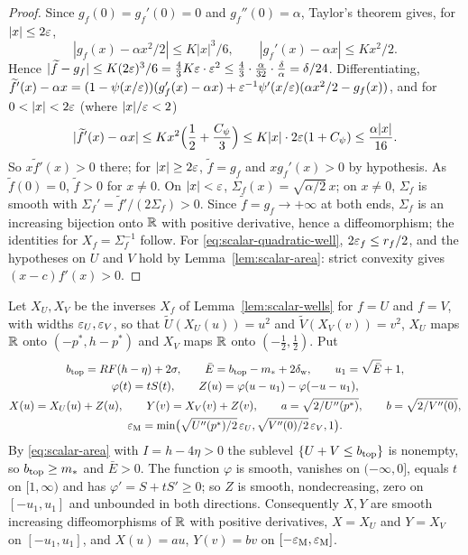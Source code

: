 \begin{proof}
Since $g_f(0)=g_f'(0)=0$ and $g_f''(0)=\alpha$, Taylor's theorem gives, for $|x|\le2\varepsilon$,
\[
 |g_f(x)-\alpha x^2/2|\le K|x|^3/6,\qquad |g_f'(x)-\alpha x|\le Kx^2/2 .
\]
Hence $|\widetilde f-g_f|\le K(2\varepsilon)^3/6=\frac43K\varepsilon\cdot\varepsilon^2\le\frac43\cdot\frac\alpha{32}\cdot\frac\delta\alpha
=\delta/24$. Differentiating,
$\widetilde f'(x)-\alpha x=(1-\psi(x/\varepsilon))(g_f'(x)-\alpha x)+\varepsilon^{-1}\psi'(x/\varepsilon)(\alpha x^2/2-g_f(x))$, and for
$0<|x|<2\eps$ (where $|x|/\varepsilon<2$)
\[
 |\widetilde f'(x)-\alpha x|\le Kx^2\Bigl(\frac12+\frac{C_\psi}3\Bigr)\le K|x|\cdot2\varepsilon(1+C_\psi)\le\frac{\alpha|x|}{16}.
\]
So $x\widetilde f'(x)>0$ there; for $|x|\ge2\varepsilon$, $\widetilde f=g_f$ and $xg_f'(x)>0$ by hypothesis. As
$\widetilde f(0)=0$, $\widetilde f>0$ for $x\ne0$. On $|x|<\varepsilon$, $\Sigma_f(x)=\sqrt{\alpha/2}\,x$; on $x\ne0$,
$\Sigma_f$ is smooth with $\Sigma_f'=\widetilde f'/(2\Sigma_f)>0$. Since $\widetilde f=g_f\to+\infty$ at both ends,
$\Sigma_f$ is an increasing bijection onto $\mathbb{R}$ with positive derivative, hence a diffeomorphism; the identities for
$X_f=\Sigma_f^{-1}$ follow. For \eqref{eq:scalar-quadratic-well}, $2\varepsilon_f\le r_f/2$, and the hypotheses on $U$
and $V$ hold by Lemma~\ref{lem:scalar-area}: strict convexity gives $(x-c)f'(x)>0$.
\end{proof}

Let $X_U,X_V$ be the inverses $X_f$ of Lemma~\ref{lem:scalar-wells} for $f=U$ and $f=V$, with widths $\varepsilon_U,\varepsilon_V$,
so that $\widetilde U(X_U(u))=u^2$ and $\widetilde V(X_V(v))=v^2$, $X_U$ maps $\mathbb{R}$ onto $(-p^*,h-p^*)$ and $X_V$ maps $\mathbb{R}$
onto $(-\frac12,\frac12)$. Put
\begin{gather}\label{eq:scalar-endpoint-data}
 b_{\rm top}=RF(h-\eta)+2\sigma,\qquad
 \bar E=b_{\rm top}-m_*+2\delta_{\rm w},\qquad u_1=\sqrt{\bar E}+1,\\
 \varphi(t)=tS(t),\qquad Z(u)=\varphi(u-u_1)-\varphi(-u-u_1),\notag\\
 X(u)=X_U(u)+Z(u),\qquad Y(v)=X_V(v)+Z(v),\qquad
 a=\sqrt{2/U''(p^*)},\qquad b=\sqrt{2/V''(0)},\notag\\
 \varepsilon_{\rm M}=\min\bigl(\sqrt{U''(p^*)/2}\,\varepsilon_U,
                          \sqrt{V''(0)/2}\,\varepsilon_V,1\bigr).\notag
\end{gather}
By \eqref{eq:scalar-area} with $I=h-4\eta>0$ the sublevel $\{U+V\le b_{\rm top}\}$ is nonempty, so $b_{\rm top}\ge m_*$
and $\bar E>0$. The function $\varphi$ is smooth, vanishes on $(-\infty,0]$, equals $t$ on $[1,\infty)$ and has
$\varphi'=S+tS'\ge0$; so $Z$ is smooth, nondecreasing, zero on $[-u_1,u_1]$ and unbounded in both directions.
Consequently $X,Y$ are smooth increasing diffeomorphisms of $\mathbb{R}$ with positive derivatives, $X=X_U$ and $Y=X_V$ on
$[-u_1,u_1]$, and $X(u)=au$, $Y(v)=bv$ on $[-\varepsilon_{\rm M},\varepsilon_{\rm M}]$.

